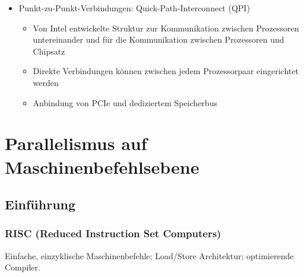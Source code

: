 \begin{itemize}
\begin{itemize}
\begin{itemize}
		\end{itemize}
		\item Punkt-zu-Punkt-Verbindungen: Quick-Path-Interconnect (QPI)
		\begin{itemize}
			\item Von Intel entwickelte Struktur zur Kommunikation zwischen Prozessoren untereinander und für die Kommunikation zwischen Prozessoren und Chipsatz
			\item Direkte Verbindungen können zwischen jedem Prozessorpaar eingerichtet werden
			\item Anbindung von PCIe und dediziertem Speicherbus
		\end{itemize}
	\end{itemize}
\end{itemize}



\section{Parallelismus auf Maschinenbefehlsebene}

\subsection{Einführung}

\subsubsection{RISC (Reduced Instruction Set Computers)}
Einfache, einzyklische Maschinenbefehle; Load/Store Architektur; optimierende Compiler.

